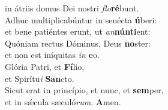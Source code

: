 \oddverse in átriis domus Dei nostri \textit{flo}\textbf{ré}bunt.\\
\evenverse Adhuc multiplicabúntur in senécta \textbf{ú}beri:~\*\\
\evenverse et bene patiéntes erunt, ut \textit{an}\textbf{nún}\textbf{ti}ent:\\
\oddverse Quóniam rectus Dóminus, Deus \textbf{no}ster:~\*\\
\oddverse et non est iníquitas \textit{in} \textbf{e}o.\\
\evenverse Glória Patri, et \textbf{Fí}lio,~\*\\
\evenverse et Spirítu\textit{i} \textbf{San}cto.\\
\oddverse Sicut erat in princípio, et nunc, et \textbf{sem}per,~\*\\
\oddverse et in sǽcula sæculó\textit{rum}. \textbf{A}men.\\
